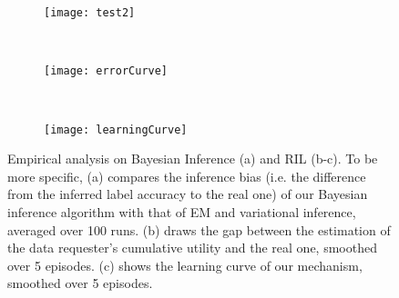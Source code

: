 \documentclass{article}
\newcommand{\com}[1]{\textbf{\color{red}(COMMENT: #1)}} %
\newcommand{\com}[1]{}
\begin{document}


\begingroup
\vspace{3mm}
\begin{figure}[t]
    \centering
    \begin{subfigure}[t]{0.32\textwidth}
        \centering
        \texttt{[image: test2]}
	\caption{\label{inference bias}}
    \end{subfigure}%
    ~
    \begin{subfigure}[t]{0.32\textwidth}
        \centering
       \texttt{[image: errorCurve]}
        \caption{\label{figure:rewardError}}

    \end{subfigure}
        ~
    \begin{subfigure}[t]{0.32\textwidth}
        \centering
        \texttt{[image: learningCurve]}
                \caption{\label{figure:learningCurve}}
    \end{subfigure}
\caption{Empirical analysis on Bayesian Inference (a) and RIL (b-c). To be more specific, (a) compares the inference bias (i.e. the difference from the inferred label accuracy to the real one)  of our Bayesian inference algorithm with that of EM and variational inference, averaged over 100 runs. (b) draws the gap between the estimation of the data requester’s cumulative utility and the real one, smoothed over 5 episodes. (c) shows the learning curve of our mechanism, smoothed over 5 episodes.}
\vspace{-5mm}
\end{figure}
\end{document}

